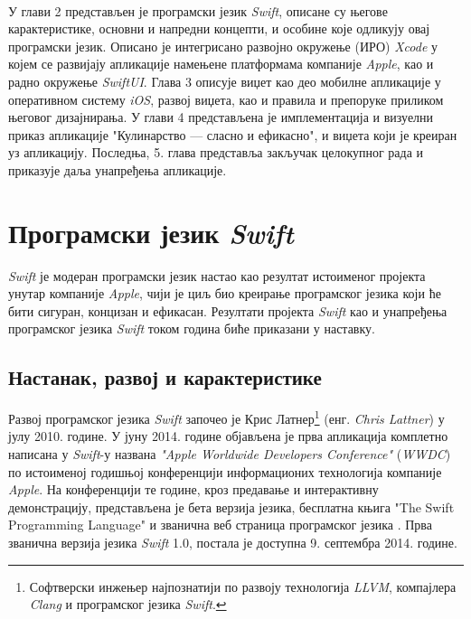 \documentclass[12pt,oneside]{memoir}
\begin{document}
\\
\indent У глави 2 представљен је програмски језик \textit{Swift}, описане су његове карактеристике, основни и напредни концепти, и особине које одликују овај програмски језик. Описано је интегрисано развојно окружење (ИРО) \textit{Xcode} у којем се развијају апликације намењене платформама компаније \textit{Apple}, као и радно окружење \textit{SwiftUI}. Глава 3 описује виџет као део мобилне апликације у оперативном систему \textit{iOS}, развој виџета, као и правила и препоруке приликом његовог дизајнирања. У глави 4 представљена је имплементација и визуелни приказ апликације "Кулинарство --- сласно и ефикасно", и виџета који је креиран уз апликацију. Последња, 5. глава представља закључак целокупног рада и приказује даља унапређења апликације.

\chapter{Програмски језик \textit{Swift}}

\indent \textit{Swift} је модеран програмски језик настао као резултат истоименог пројекта унутар компаније \textit{Apple}, чији је циљ био креирање програмског језика  који ће бити сигуран, концизан и ефикасан. Резултати пројекта \textit{Swift} као и унапређења програмског језика \textit{Swift} током година биће приказани у наставку. 

\section{Настанак, развој и карактеристике}

\indent Развој програмског језика \textit{Swift} започео је Крис Латнер\footnote{Софтверски инжењер најпознатији по развоју технологија \textit{LLVM}, компајлера \textit{Clang} и програмског језика \textit{Swift}.} (енг. \textit{Chris Lattner}) у јулу 2010. године. У јуну 2014. године објављена је прва апликација комплетно написана у \textit{Swift}-у названа \textit{"Apple Worldwide Developers Conference"} (\textit{WWDC}) по истоименој годишњој конференцији информационих технологија компаније \textit{Apple}. На конференцији те године, кроз предавање и интерактивну демонстрацију, представљена је бета верзија језика, бесплатна књига "The Swift Programming Language" \cite{The_Swift_Programming_Language} и званична веб страница програмског језика \cite{SwiftOfficialSite}. Прва званична верзија језика \textit{Swift} 1.0, постала је доступна 9. септембра 2014. године.
\end{document}
